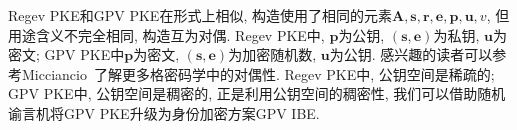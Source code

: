 \begin{remark}
Regev PKE和GPV PKE在形式上相似, 构造使用了相同的元素$\mathbf{A}, \mathbf{s}, \mathbf{r}, \mathbf{e}, \mathbf{p}, \mathbf{u}, v$, 
但用途含义不完全相同, 构造互为对偶. Regev PKE中, $\mathbf{p}$为公钥, $(\mathbf{s}, \mathbf{e})$为私钥, $\mathbf{u}$为密文; 
GPV PKE中$\mathbf{p}$为密文, $(\mathbf{s}, \mathbf{e})$为加密随机数, $\mathbf{u}$为公钥. 
感兴趣的读者可以参考Micciancio~\cite{Micciancio-PKC-2010}了解更多格密码学中的对偶性. 
Regev PKE中, 公钥空间是稀疏的; GPV PKE中, 公钥空间是稠密的, 正是利用公钥空间的稠密性, 
我们可以借助随机谕言机将GPV PKE升级为身份加密方案GPV IBE. 
\end{remark}